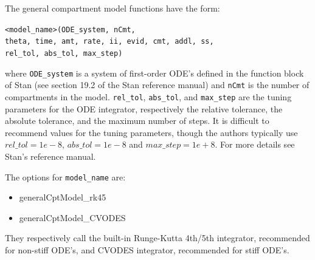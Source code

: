 \documentclass[11pt]{amsart}
\begin{document}
The general compartment model functions have the form:

\texttt{<model\_name>(ODE\_system, nCmt, \\
                              theta, time, amt, rate, ii, evid, cmt, addl, ss, \\
                              rel\_tol, abs\_tol, max\_step)}
                              
where \texttt{ODE\_system} is a system of first-order ODE's defined in the function block of Stan (see section 19.2 of the Stan reference manual) and \texttt{nCmt} is the number of compartments in the model. \texttt{rel\_tol}, \texttt{abs\_tol}, and \texttt{max\_step} are the tuning parameters for the ODE integrator, respectively the relative tolerance, the absolute tolerance, and the maximum number of steps. It is difficult to recommend values for the tuning parameters, though the authors typically use $rel\_tol = 1e-8$, $abs\_tol = 1e-8$ and $max\_step = 1e+8$. For more details see Stan's reference manual.

The options for \texttt{model\_name} are:
\begin{itemize}
  \item generalCptModel\_rk45
  \item generalCptModel\_CVODES
\end{itemize}

They respectively call the built-in Runge-Kutta 4th/5th integrator, recommended for non-stiff ODE's, and CVODES integrator, recommended for stiff ODE's.
\end{document}
